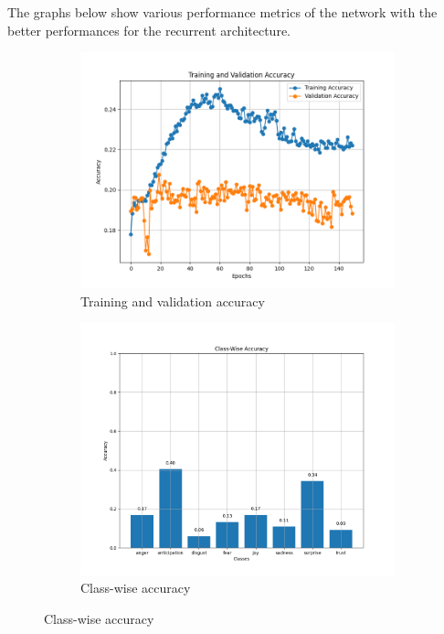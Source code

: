 The graphs below show various performance metrics of the network with the better
performances for the recurrent architecture.
\begin{figure}[H]
    \centering
    \begin{subfigure}{0.48\textwidth}
        \includegraphics[width=\textwidth]{pictures/rnn_accuracy.png}
        \caption{Training and validation accuracy}
        \label{fig:rnn_train_val_acc}
    \end{subfigure}
    \begin{subfigure}{0.5\textwidth}
        \includegraphics[width=\textwidth]{pictures/rnn_class_accuracy.png}
        \caption{Class-wise accuracy}

\end{subfigure}
\end{figure}
